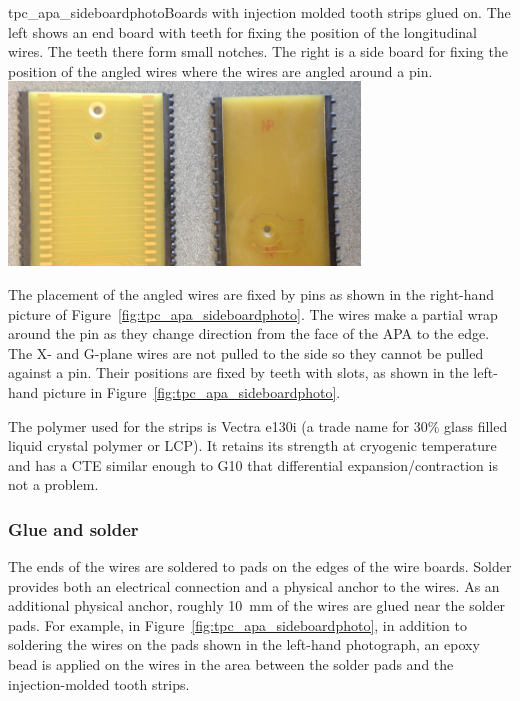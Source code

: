 \begin{cdrfigure}{tpc_apa_sideboardphoto}{Boards with injection molded tooth strips glued on.  The left shows an end board with teeth for fixing the position of the longitudinal wires.  The teeth there form small notches. The right is a side board for fixing the position of the angled wires where the wires are angled around a pin.}
\includegraphics[width=0.7\textwidth]{figures/tpc_apa_sideboardphoto.png} 
\end{cdrfigure}

The placement of the angled wires are fixed by pins 
as shown in the right-hand picture of Figure~\ref{fig:tpc_apa_sideboardphoto}.  The wires make a partial wrap around the pin as they change direction from the face of the APA to the edge.  The X- and G-plane wires are not pulled to the side so they cannot be pulled against a pin.  Their positions are fixed %
by teeth with slots, as shown in the left-hand picture in Figure~\ref{fig:tpc_apa_sideboardphoto}. 
	
The polymer used for the strips is Vectra e130i (a trade name for 30$\%$ glass filled liquid crystal polymer or LCP). It retains its strength at cryogenic temperature and has a CTE similar enough to G10 that differential expansion/contraction is not a problem.

\subsubsection{Glue and solder}
The ends of the wires are soldered to pads on the edges of the wire boards.  Solder provides both an electrical connection and a physical anchor to the wires.  As an additional physical anchor, roughly 10~mm of the wires are glued near the solder pads.  For example, in Figure~\ref{fig:tpc_apa_sideboardphoto}, in addition to soldering the wires on the pads shown in the left-hand photograph, an epoxy bead is applied on the wires in the area between the solder pads and the injection-molded tooth strips.

